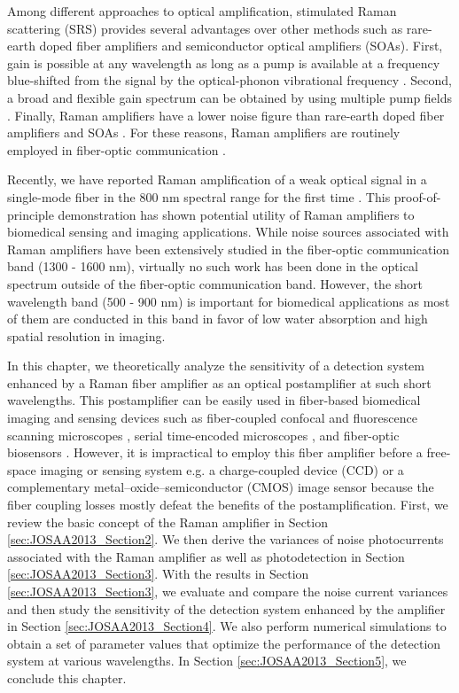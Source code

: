 Among different approaches to optical amplification, stimulated Raman scattering (SRS) \cite{agrawal2007nonlinear,islam2002raman} provides several advantages over other methods such as rare-earth doped fiber amplifiers and semiconductor optical amplifiers (SOAs). First, gain is possible at any wavelength as long as a pump is available at a frequency blue-shifted from the signal by the optical-phonon vibrational frequency \cite{agrawal2007nonlinear}. Second, a broad and flexible gain spectrum can be obtained by using multiple pump fields \cite{islam2002raman}. Finally, Raman amplifiers have a lower noise figure than rare-earth doped fiber amplifiers and SOAs \cite{islam2002raman,goda2009demonstration}. For these reasons, Raman amplifiers are routinely employed in fiber-optic communication \cite{islam2002raman}.

Recently, we have reported Raman amplification of a weak optical signal in a single-mode fiber in the 800 nm spectral range for the first time \cite{goda2009demonstration,mahjoubfar2010raman}. This proof-of-principle demonstration has shown potential utility of Raman amplifiers to biomedical sensing and imaging applications. While noise sources associated with Raman amplifiers have been extensively studied in the fiber-optic communication band (1300 - 1600 nm), virtually no such work has been done in the optical spectrum outside of the fiber-optic communication band. However, the short wavelength band (500 - 900 nm) is important for biomedical applications as most of them are conducted in this band in favor of low water absorption and high spatial resolution in imaging.

In this chapter, we theoretically analyze the sensitivity of a detection system enhanced by a Raman fiber amplifier as an optical postamplifier at such short wavelengths. This postamplifier can be easily used in fiber-based biomedical imaging and sensing devices such as fiber-coupled confocal and fluorescence scanning microscopes \cite{bird2002compact,kimura1991confocal}, serial time-encoded microscopes \cite{goda2009serial,tsia2010performance,goda2012hybrid,mahjoubfar2013label}, and fiber-optic biosensors \cite{wolfbeis2004fiber,song2006refractive,piliarik2003surface}. However, it is impractical to employ this fiber amplifier before a free-space imaging or sensing system e.g. a charge-coupled device (CCD) or a complementary metal--oxide--semiconductor (CMOS) image sensor because the fiber coupling losses mostly defeat the benefits of the postamplification. First, we review the basic concept of the Raman amplifier in Section \ref{sec:JOSAA2013_Section2}. We then derive the variances of noise photocurrents associated with the Raman amplifier as well as photodetection in Section \ref{sec:JOSAA2013_Section3}. With the results in Section \ref{sec:JOSAA2013_Section3}, we evaluate and compare the noise current variances and then study the sensitivity of the detection system enhanced by the amplifier in Section \ref{sec:JOSAA2013_Section4}. We also perform numerical simulations to obtain a set of parameter values that optimize the performance of the detection system at various wavelengths. In Section \ref{sec:JOSAA2013_Section5}, we conclude this chapter.


